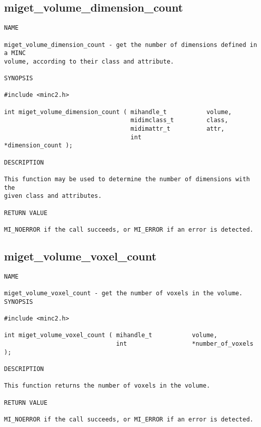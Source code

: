 \documentclass{article}
\begin{document}
\subsection{miget\_volume\_dimension\_count}
\begin{verbatim}
NAME

miget_volume_dimension_count - get the number of dimensions defined in a MINC
volume, according to their class and attribute.

SYNOPSIS

#include <minc2.h>

int miget_volume_dimension_count ( mihandle_t           volume, 
                                   midimclass_t         class,
                                   midimattr_t          attr,
                                   int                  *dimension_count );

DESCRIPTION

This function may be used to determine the number of dimensions with the
given class and attributes.

RETURN VALUE

MI_NOERROR if the call succeeds, or MI_ERROR if an error is detected.
\end{verbatim}

\subsection{miget\_volume\_voxel\_count}
\begin{verbatim}
NAME

miget_volume_voxel_count - get the number of voxels in the volume.
SYNOPSIS

#include <minc2.h>

int miget_volume_voxel_count ( mihandle_t           volume, 
                               int                  *number_of_voxels );

DESCRIPTION

This function returns the number of voxels in the volume.

RETURN VALUE

MI_NOERROR if the call succeeds, or MI_ERROR if an error is detected.
\end{verbatim}
\end{document}

